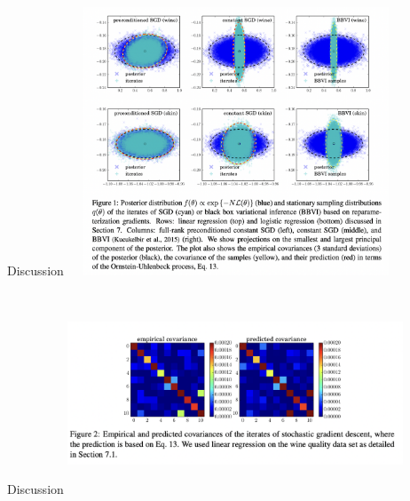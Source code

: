 \documentclass{beamer}
\begin{document}
\begin{frame}{Discussion}
    \includegraphics[width=10cm, height=8cm]{fig1.png}
\end{frame}

\begin{frame}{Discussion}
    \includegraphics[width=10cm, height=6cm]{fig2.png}
    
\end{frame}
\end{document}
